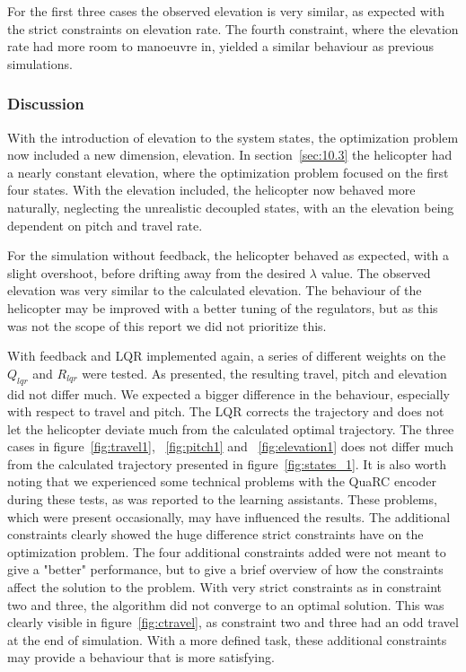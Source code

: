 For the first three cases the observed elevation is very similar, as expected with the strict constraints on elevation rate. The fourth constraint, where the elevation rate had more room to manoeuvre in, yielded a similar behaviour as previous simulations. 

\subsubsection{Discussion}
With the introduction of elevation to the system states, the optimization problem now included a new dimension, elevation. In section~\ref{sec:10.3} the helicopter had a nearly constant elevation, where the optimization problem focused on the first four states. With the elevation included, the helicopter now behaved more naturally, neglecting the unrealistic decoupled states, with an the elevation being dependent on pitch and travel rate.

For the simulation without feedback, the helicopter behaved as expected, with a slight overshoot, before drifting away from the desired $\lambda$ value. The observed elevation was very similar to the calculated elevation. The behaviour of the helicopter may be improved with a better tuning of the regulators, but as this was not the scope of this report we did not prioritize this.

With feedback and LQR implemented again, a series of different weights on the $Q_{lqr}$ and $R_{lqr}$ were tested. As presented, the resulting travel, pitch and elevation did not differ much. We expected a bigger difference in the behaviour, especially with respect to travel and pitch. The LQR corrects the trajectory and does not let the helicopter deviate much from the calculated optimal trajectory. The three cases in figure~\ref{fig:travel1}, ~\ref{fig:pitch1} and ~\ref{fig:elevation1} does not differ much from the calculated trajectory presented in figure~\ref{fig:states_1}. It is also worth noting that we experienced some technical problems with the QuaRC encoder during these tests, as was reported to the learning assistants. These problems, which were present occasionally, may have influenced the results. 
The additional constraints clearly showed the huge difference strict constraints have on the optimization problem. The four additional constraints added were not meant to give a "better" performance, but to give a brief overview of how the constraints affect the solution to the problem. With very strict constraints as in constraint two and three, the algorithm did not converge to an optimal solution. This was clearly visible in figure~\ref{fig:ctravel}, as constraint two and three had an odd travel at the end of simulation. With a more defined task, these additional constraints may provide a behaviour that is more satisfying.